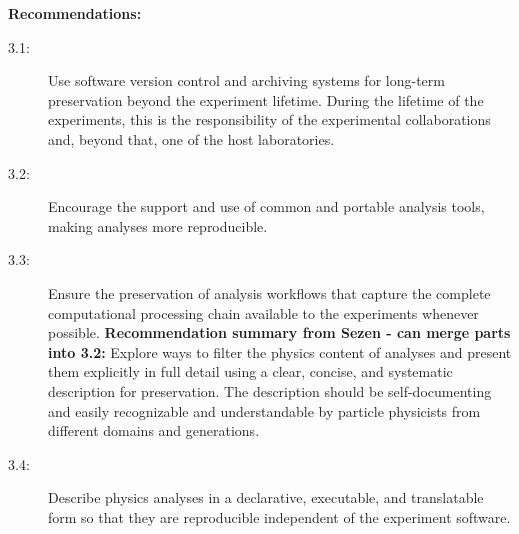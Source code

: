 \documentclass[11pt]{article}
\begin{document}

\noindent
\textbf{Recommendations:}
\begin{description}
   \item[3.1:] Use software version control and archiving systems for long-term preservation beyond the experiment lifetime.
   During the lifetime of the experiments, this is the responsibility of the experimental collaborations and, beyond that, one of the host laboratories.
   \item[3.2:] Encourage the support and use of common and portable analysis tools, making analyses more reproducible.
   \item[3.3:] Ensure the preservation of analysis workflows that capture the complete computational processing chain available to the experiments whenever possible.
   \textbf{Recommendation summary from Sezen - can merge parts into 3.2:} Explore ways to filter the physics content of analyses and present them explicitly in full detail using a clear, concise, and systematic description for preservation. The description should be self-documenting and easily recognizable and understandable by particle physicists from different domains and generations.  
   \item[3.4:] Describe physics analyses in a declarative, executable, and translatable form so that they are reproducible independent of the experiment software.
\end{description}
\end{document}

